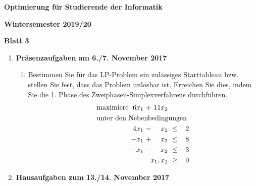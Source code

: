 \documentclass[11pt, a4paper]{article}
\begin{document}
\begin{center}
\begin{Large}
\textbf{Optimierung für Studierende der Informatik}
\end{Large}

\textbf{}
	
\vspace{0.5cm}

\textbf{Wintersemester 2019/20}

\textbf{Blatt 3}

\vspace{0.5cm}
\end{center}

\small

\begin{enumerate}[\bfseries A:]


\item \textbf{Präsenzaufgaben am 6./7. November 2017}

\begin{enumerate}[\bfseries 1.]


\item Bestimmen Sie für das LP-Problem ein zulässiges Starttableau bzw. stellen Sie fest, dass das Problem unlösbar ist. Erreichen Sie dies, indem Sie die 1. Phase des Zweiphasen-Simplexverfahrens durchführen.
\begin{align*}
\begin{alignedat}{4}
& \text{maximiere } & 6x_1 &\ + &\ 11x_2 & & \\
& \rlap{unter den Nebenbedingungen} & & & & & \\
&& 4x_1 &\ - &\ x_2 &\ \leq &\  2 \\
&& -x_1 &\ + &\ x_2 &\ \leq &\  8 \\
&& -x_1 &\ - &\ x_2 &\ \leq &\ -3 \\
&&&& \llap{$x_1,x_2$} &\ \geq &\ 0
\end{alignedat}
\end{align*}	
	
\end{enumerate}


\item \textbf{Hausaufgaben zum 13./14. November 2017}


\end{enumerate}
\end{document}
